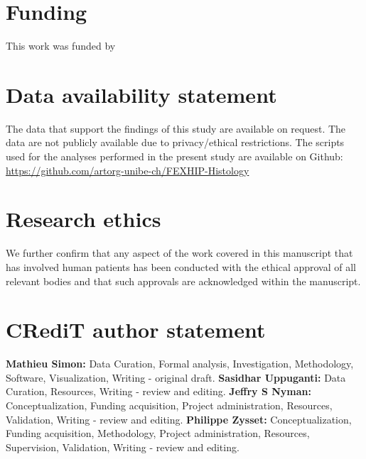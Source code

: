 \documentclass[a4paper,fleqn]{DC_ArtStyle}
\begin{document}
	\section*{Funding}
	This work was funded by

	\section*{Data availability statement}
	The data that support the findings of this study are available on request. The data are not publicly available due to privacy/ethical restrictions. The scripts used for the analyses performed in the present study are available on Github: \url{https://github.com/artorg-unibe-ch/FEXHIP-Histology}
	
	\section*{Research ethics}
	We further confirm that any aspect of the work covered in this manuscript that has involved human patients has been conducted with the ethical approval of all relevant bodies and that such approvals are acknowledged within the manuscript.
	
	\section*{CRediT author statement}
	\textbf{Mathieu Simon:} Data Curation, Formal analysis, Investigation, Methodology, Software, Visualization, Writing - original draft.
	\textbf{Sasidhar Uppuganti:} Data Curation, Resources, Writing - review and editing.
	\textbf{Jeffry S Nyman:} Conceptualization, Funding acquisition, Project administration, Resources, Validation, Writing - review and editing.
	\textbf{Philippe Zysset:} Conceptualization, Funding acquisition, Methodology, Project administration, Resources, Supervision, Validation, Writing - review and editing.
	

	\nocite{*}
	
	

\end{document}
